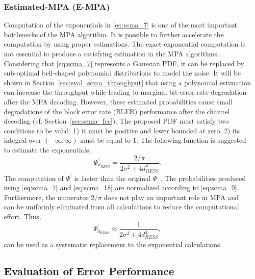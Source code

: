 \subsubsection{Estimated-MPA (E-MPA)}

Computation of the exponentials in \eqref{eq:scma_7} is one of the most
important bottlenecks of the MPA algorithm. It is possible to further accelerate
the computation by using proper estimations. The exact exponential computation
is not essential to produce a satisfying estimation in the MPA algorithms.
Considering that \eqref{eq:scma_7} represents a Gaussian PDF, it can be replaced
by sub-optimal bell-shaped polynomial distributions to model the noise. It will
be shown in Section~\ref{sec:eval_scma_throughput} that using a
polynomial estimation can increase the throughput while leading to marginal bit
error rate degradation after the MPA decoding. However, these estimated
probabilities cause small degradations of the block error rate (BLER)
performance after the channel decoding (cf. Section~\ref{sec:scma_fec}). The
proposed PDF must satisfy two conditions to be valid: 1) it must be positive and
lower bounded at zero, 2) its integral over $(-\infty, \infty)$ must be equal to
1. The following function is suggested to estimate the exponentials:
\begin{equation}
  \label{eq:scma_18}
  \Psi^{'}_{d_{RES \beta}} = \frac{2 / \pi}{2\sigma^2 + 4d^4_{RES \beta}}.
\end{equation}
The computation of $\Psi^{'}$ is faster than the original
$\Psi$~\cite{Ghaffari2017}. The probabilities produced using \eqref{eq:scma_7}
and \eqref{eq:scma_18} are normalized according to \eqref{eq:scma_9}.
Furthermore, the numerator $2/\pi$ does not play an important role in MPA and
can be uniformly eliminated from all calculations to reduce the computational
effort. Thus,
\begin{equation}
  \label{eq:scma_19}
  \Psi^{'}_{d_{RES \beta}} \approx \frac{1}{2\sigma^2 + 4d^4_{RES \beta}},
\end{equation}
can be used as a systematic replacement to the exponential calculations.

\subsection{Evaluation of Error Performance}
\label{sec:scma_perf}


